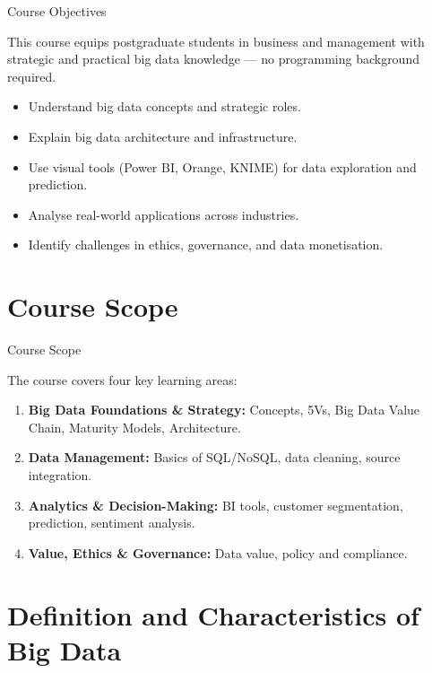 \documentclass[aspectratio=169, table]{beamer}
\begin{document}
\begin{frame}[fragile]{Course Objectives}
	
	This course equips postgraduate students in business and management with strategic and practical big data knowledge — no programming background required.
	
	\vspace{4pt}
	\begin{itemize}
		\item Understand big data concepts and strategic roles.
		\item Explain big data architecture and infrastructure.
		\item Use visual tools (Power BI, Orange, KNIME) for data exploration and prediction.
		\item Analyse real-world applications across industries.
		\item Identify challenges in ethics, governance, and data monetisation.
	\end{itemize}
\end{frame}

\section{Course Scope}

\begin{frame}[fragile]{Course Scope}
	
	The course covers four key learning areas:
	
	\vspace{4pt}
	\begin{enumerate}
		\item \textbf{Big Data Foundations \& Strategy:} Concepts, 5Vs, Big Data Value Chain, Maturity Models, Architecture.
		\item \textbf{Data Management:} Basics of SQL/NoSQL, data cleaning, source integration.
		\item \textbf{Analytics \& Decision-Making:} BI tools, customer segmentation, prediction, sentiment analysis.
		\item \textbf{Value, Ethics \& Governance:} Data value, policy and compliance.
	\end{enumerate}
\end{frame}


\section{Definition and Characteristics of Big Data}
\end{document}
